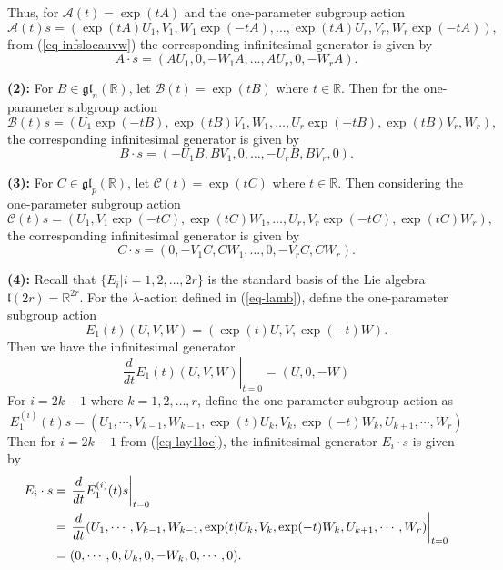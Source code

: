 \documentclass[reqno]{amsart}
\theoremstyle{definition}
\numberwithin{equation}{section}
\theoremstyle{remark}
\begin{document}
Thus, for $\mathcal{A}(t)=\exp(tA)$ and the one-parameter subgroup action
$$\mathcal{A}(t)s=
(\exp(tA)U_1,V_1,W_1\exp(-tA),\ldots,\exp(tA)U_r,V_r,W_r\exp(-tA)),
$$
from (\ref{eq-infslocauvw}) the corresponding infinitesimal generator is given by
\begin{equation}\label{eq-AS}
A\cdot s=(AU_1, 0 ,-W_1A,\ldots, AU_r, 0, -W_r A).
\end{equation}

\textbf{(2):} For $B \in \mathfrak{gl}_n(\mathbb{R})$, let $\mathcal{B}(t)=\exp(tB)$ where $t\in \mathbb{R}$.
Then for the one-parameter subgroup action
$$\mathcal{B}(t)s=
(U_1\exp(-tB),\exp(tB)V_1,W_1,\ldots,U_r\exp(-tB),\exp(tB)V_r,W_r),
$$
the corresponding infinitesimal generator is given by
\begin{equation}\label{eq-BS}
B\cdot s=
(-U_1 B, B V_1, 0,\ldots, -U_r B, B V_r, 0).
\end{equation}

\textbf{(3):} For  $C \in \mathfrak{gl}_p(\mathbb{R})$, let $\mathscr{C}(t)=\exp(tC)$ where $t\in \mathbb{R}$.
Then considering the one-parameter subgroup action
$$\mathscr{C}(t)s=
(U_1,V_1\exp(-tC),\exp(tC)W_1,\ldots,U_r,V_r\exp(-tC),\exp(tC)W_r),
$$
the corresponding infinitesimal generator is given by
\begin{equation}\label{eq-CS}
C\cdot s=
(0, -V_1 C, C W_1,\ldots, 0, -V_r C, C W_r).
\end{equation}

\textbf{(4):} Recall that $\{E_i|i=1,2,\ldots,2r\}$ is the standard basis of the Lie algebra $\mathfrak{l}(2r)=\mathbb{R}^{2r}$. 
For the $\lambda$-action defined in (\ref{eq-lamb}), define the one-parameter subgroup action
\begin{equation*}
E_1(t) (U,V,W)
=\left(\exp(t)U, V , \exp(-t)W \right).
\end{equation*}
Then we have the infinitesimal generator
\begin{equation}\label{eq-lay1loc}
\left.\frac{d}{dt} E_1(t)(U,V,W)\right|_{t=0}=( U, 0, - W)
\end{equation}
For $i=2k-1$ where $k=1,2,\ldots,r$,
define the one-parameter subgroup action as
$$E_1^{(i)}(t) s=(U_1,\cdots, V_{k-1}, W_{k-1}, \exp(t) U_k, V_k, 
\exp(-t)W_k,  U_{k+1}, \cdots,W_r)$$
Then for $i=2k-1$ from (\ref{eq-lay1loc}), the infinitesimal generator $E_i\cdot s$ is given by
\begin{align}
E_i \cdot s&=\left.\frac{d}{dt} E_1^{(i)}(t) s \right|_{t=0}\label{eq-ei2k-1}\\
&=\left.\frac{d}{dt}(U_1,\cdots, V_{k-1}, W_{k-1}, \exp(t) U_k, V_k, \exp(-t)W_k,  U_{k+1}, \cdots, W_r)\right|_{t=0}\notag\\
&=(0,\cdots, 0,  U_k, 0, -W_k, 0,\cdots,0).\notag
\end{align}
\end{document}

